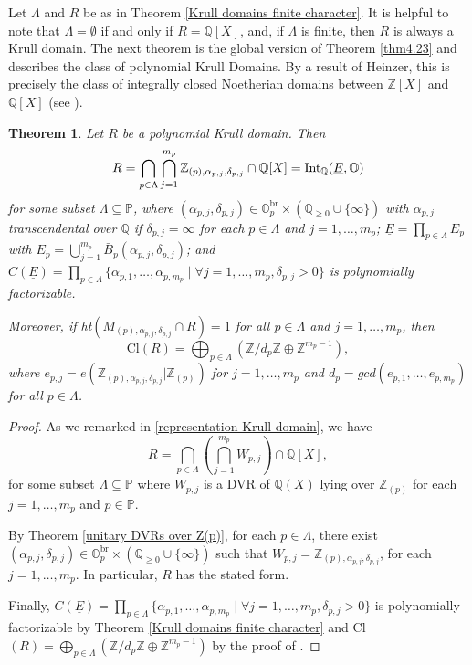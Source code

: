 \documentclass[10pt]{article}
\numberwithin{equation}{section}
\newtheorem{Thm}[equation]{Theorem}
\theoremstyle{definition}
\theoremstyle{definition}
\newcommand{\Q}{\mathbb{Q}}
\newcommand{\Z}{\mathbb{Z}}
\renewcommand{\O}{\mathbb{O}}
\newcommand{\PP}{\mathbb{P}}
\newcommand{\Int}{\textnormal{Int}}
\newcommand{\IntQ}{\Int_{\Q}}
\newcommand{\uE}{\underline{E}}
\newcommand{\br}{\text{br}}
\begin{document}
Let $\Lambda$ and $R$ be as in Theorem \ref{Krull domains finite character}. It is helpful to note that $\Lambda = \emptyset$ if and only if $R = \Q[X]$, and, if $\Lambda$ is finite, then $R$ is always a Krull domain. 
The next theorem is the global version of Theorem \ref{thm4.23} and describes the class of polynomial Krull Domains. 
By a result of Heinzer, this is precisely the class of integrally closed Noetherian domains between $\Z[X]$ and $\Q[X]$ (see \cite{Heinzer}).

\begin{Thm}\label{main thm polynomial krull domains}
Let $R$ be a polynomial Krull domain. Then  
\begin{equation}\label{Krull domain as int ring}
R=\bigcap_{p\in\Lambda}\bigcap_{j=1}^{m_p}\Z_{(p),\alpha_{p,j},\delta_{p,j}}\cap\Q[X]=\IntQ(\uE,\O)    
\end{equation}
for some subset $\Lambda\subseteq\PP$, where $(\alpha_{p,j},\delta_{p,j})\in\O_p^{\br}\times(\Q_{\geq0}\cup\{\infty\})$ 
with $\alpha_{p,j}$ transcendental over $\Q$ if $\delta_{p,j}=\infty$ for each $p\in\Lambda$ and $j=1,\ldots,m_p$; 
$\uE=\prod\limits_{p\in\Lambda} E_p$ with  $E_p=\bigcup\limits_{j=1}^{m_p}\bar B_p(\alpha_{p,j},\delta_{p,j})$; and $C(\uE)=\prod\limits_{p\in\Lambda}\{\alpha_{p,1},\ldots,\alpha_{p,m_p} \mid \forall j=1,\ldots,m_p,\delta_{p,j}>0\}$ is polynomially factorizable.


Moreover, if ht$(M_{(p),\alpha_{p,j},\delta_{p,j}} \cap R) =1$ for all $p \in \Lambda$ and
$j=1, \dots, m_p$, then $$\text{Cl}(R) = \bigoplus_{p \in \Lambda}(\Z/d_p\Z \oplus \Z^{m_p-1}),$$ where
$e_{p,j} = e(\Z_{(p),\alpha_{p,j},\delta_{p,j}}|\Z_{(p)})$ for $j=1, \dots , m_p$ and $d_p= gcd(e_{p,1}, \dots , e_{p,m_p})$
for all $p \in \Lambda$.
\end{Thm}
\begin{proof}
As we remarked in \eqref{representation Krull domain}, we have
$$R = \bigcap_{p \in \Lambda}(\bigcap_{j=1}^{m_p}W_{p,j}) \cap \Q[X],$$
for some subset $\Lambda\subseteq\PP$ where $W_{p,j}$ is a DVR of $\Q(X)$ lying over $\Z_{(p)}$ for each $j=1,\ldots,m_p$ and $p\in\PP$.

By  Theorem \ref{unitary DVRs over Z(p)}, for each $p\in\Lambda$, there exist  $(\alpha_{p,j},\delta_{p,j})\in\O_p^{\br}\times(\Q_{\geq0}\cup\{\infty\})$ such that $W_{p,j}=\Z_{(p),\alpha_{p,j},\delta_{p,j}}$, for each $j=1,\ldots,m_p$. In particular, $R$ has the stated form.

Finally, $C(\uE)=\prod\limits_{p\in\Lambda}\{\alpha_{p,1},\ldots,\alpha_{p,m_p} \mid \forall j=1,\ldots,m_p,\delta_{p,j}>0\}$ is polynomially factorizable by Theorem \ref{Krull domains finite character}
and Cl$(R) = \bigoplus\limits_{p \in \Lambda}(\Z/d_p\Z \oplus \Z^{m_p-1})$ by the proof of \cite[Theorem 2.4(4)]{Chang}.
\end{proof}
\end{document}
